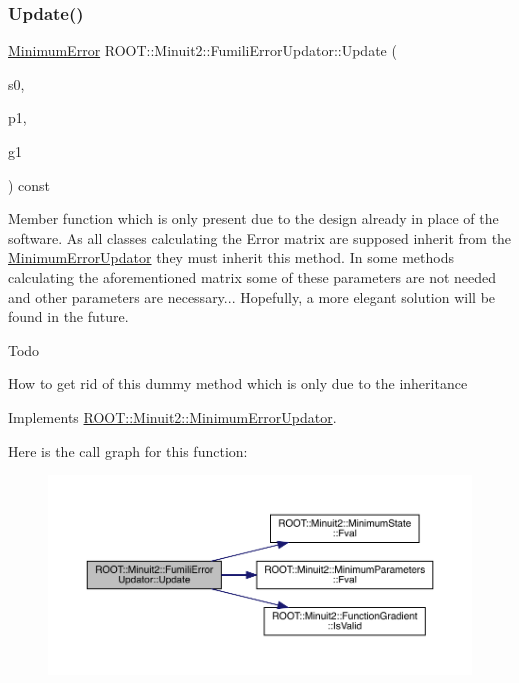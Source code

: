 \subsubsection{\texorpdfstring{Update()}{Update()}\hspace{0.1cm}{\footnotesize\ttfamily [4/4]}}
{\footnotesize\ttfamily \mbox{\hyperlink{classROOT_1_1Minuit2_1_1MinimumError}{Minimum\+Error}} R\+O\+O\+T\+::\+Minuit2\+::\+Fumili\+Error\+Updator\+::\+Update (\begin{DoxyParamCaption}\item[{const \mbox{\hyperlink{classROOT_1_1Minuit2_1_1MinimumState}{Minimum\+State}} \&}]{s0,  }\item[{const \mbox{\hyperlink{classROOT_1_1Minuit2_1_1MinimumParameters}{Minimum\+Parameters}} \&}]{p1,  }\item[{const \mbox{\hyperlink{classROOT_1_1Minuit2_1_1FunctionGradient}{Function\+Gradient}} \&}]{g1 }\end{DoxyParamCaption}) const\hspace{0.3cm}{\ttfamily [virtual]}}

Member function which is only present due to the design already in place of the software. As all classes calculating the Error matrix are supposed inherit from the \mbox{\hyperlink{classROOT_1_1Minuit2_1_1MinimumErrorUpdator}{Minimum\+Error\+Updator}} they must inherit this method. In some methods calculating the aforementioned matrix some of these parameters are not needed and other parameters are necessary... Hopefully, a more elegant solution will be found in the future.

\begin{DoxyRefDesc}{Todo}
\item[\mbox{\hyperlink{todo__todo000007}{Todo}}]How to get rid of this dummy method which is only due to the inheritance\end{DoxyRefDesc}


Implements \mbox{\hyperlink{classROOT_1_1Minuit2_1_1MinimumErrorUpdator_ae75c33152c49ebf34e6119adc0bbbda9}{R\+O\+O\+T\+::\+Minuit2\+::\+Minimum\+Error\+Updator}}.

Here is the call graph for this function\+:\nopagebreak
\begin{figure}[H]
\begin{center}
\leavevmode
\includegraphics[width=350pt]{d1/d6b/classROOT_1_1Minuit2_1_1FumiliErrorUpdator_ae5ee7f2052c474169dd19ffbc3755bd3_cgraph}
\end{center}
\end{figure}


